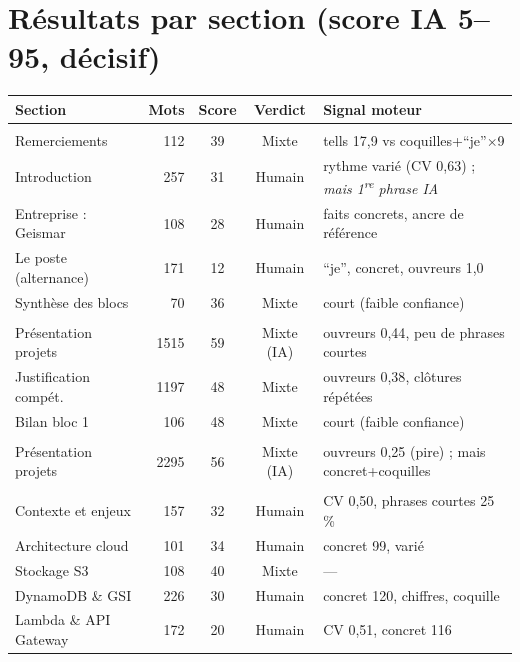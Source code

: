 \documentclass[11pt,a4paper]{article}
\newcommand{\hum}[1]{\textcolor{ok}{#1}}
\newcommand{\iaa}[1]{\textcolor{flag}{#1}}
\newcommand{\mixx}[1]{\textcolor{mix}{#1}}
\begin{document}
\section{Résultats par section (score IA 5--95, décisif)}
\begin{center}\small
\begin{tabularx}{\linewidth}{Y r c c Y}
\toprule
Section & Mots & Score & Verdict & Signal moteur \\
\midrule
{}\\
Remerciements & 112 & 39 & Mixte & tells 17,9 vs coquilles+\enquote{je}$\times$9 \\
Introduction & 257 & 31 & \hum{Humain} & rythme varié (CV 0,63) ; \emph{mais 1\textsuperscript{re} phrase IA} \\
Entreprise : Geismar & 108 & 28 & \hum{Humain} & faits concrets, ancre de référence \\
Le poste (alternance) & 171 & 12 & \hum{Humain} & \enquote{je}, concret, ouvreurs 1,0 \\
Synthèse des blocs & 70 & 36 & Mixte & court (faible confiance) \\
\midrule
{}\\
Présentation projets & 1515 & \mixx{59} & \mixx{Mixte (IA)} & ouvreurs \iaa{0,44}, peu de phrases courtes \\
Justification compét. & 1197 & 48 & Mixte & ouvreurs \iaa{0,38}, clôtures répétées \\
Bilan bloc 1 & 106 & 48 & Mixte & court (faible confiance) \\
\midrule
{}\\
Présentation projets & 2295 & \mixx{56} & \mixx{Mixte (IA)} & ouvreurs \iaa{0,25} (pire) ; mais concret+coquilles \\
\midrule
{}\\
Contexte et enjeux & 157 & 32 & \hum{Humain} & CV 0,50, phrases courtes 25\,\% \\
Architecture cloud & 101 & 34 & \hum{Humain} & concret 99, varié \\
Stockage S3 & 108 & 40 & Mixte & — \\
DynamoDB \& GSI & 226 & 30 & \hum{Humain} & concret 120, chiffres, coquille \\
Lambda \& API Gateway & 172 & 20 & \hum{Humain} & CV 0,51, concret 116 \\

\end{tabularx}
\end{center}
\end{document}
